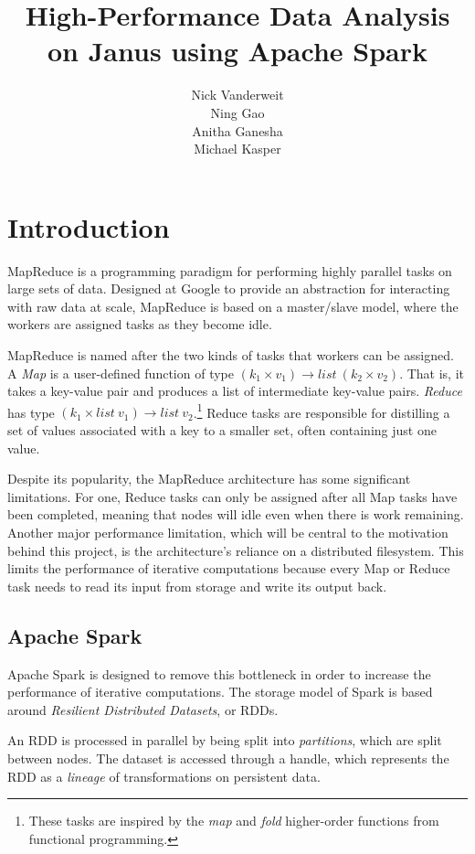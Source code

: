 \documentclass{article}
\title{High-Performance Data Analysis on Janus using Apache Spark}
\author{Nick Vanderweit \\
        Ning Gao \\
        Anitha Ganesha \\
        Michael Kasper}
\begin{document}
\maketitle

\begin{abstract}
\end{abstract}

\section*{Introduction}
MapReduce\citep{dean-mapreduce} is a programming paradigm for performing highly
parallel tasks on large sets of data. Designed at Google to provide an
abstraction for interacting with raw data at scale, MapReduce is based on
a master/slave model, where the workers are assigned tasks as they become idle.

MapReduce is named after the two kinds of tasks that workers can be assigned.
A \emph{Map} is a user-defined function of type
$(k_1 \times v_1) \rightarrow list \: (k_2 \times v_2)$.
That is, it takes a key-value pair and produces a list of
intermediate key-value pairs. \emph{Reduce} has type
$(k_1 \times list \: v_1) \rightarrow list \: v_2$.\footnote{
These tasks are inspired by the \emph{map} and \emph{fold}
higher-order functions from functional programming.}
Reduce tasks are responsible for distilling a set of values associated with
a key to a smaller set, often containing just one value.

Despite its popularity, the MapReduce architecture has some significant
limitations\citep{lee-survey}. For one, Reduce tasks can only be assigned after
all Map tasks have been completed, meaning that nodes will idle even when there
is work remaining. Another major performance limitation, which will be central
to the motivation behind this project, is the architecture's reliance on a
distributed filesystem. This limits the performance of iterative computations
because every Map or Reduce task needs to read its input from storage and write
its output back.

\subsection*{Apache Spark}
Apache Spark\citep{zaharia} is designed to remove this bottleneck in order to
increase the performance of iterative computations. The storage model of Spark
is based around \emph{Resilient Distributed Datasets}, or RDDs.

An RDD is processed in parallel by being split into \emph{partitions}, which
are split between nodes. The dataset is accessed through a handle, which
represents the RDD as a \emph{lineage} of transformations on persistent data.
\end{document}
